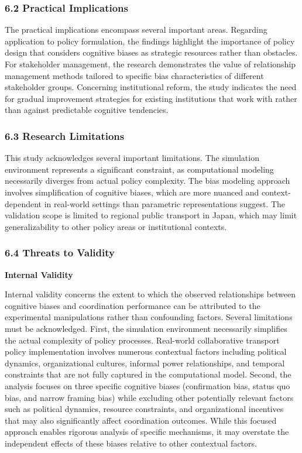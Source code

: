 \subsubsection{6.2 Practical Implications}\label{practical-implications}

The practical implications encompass several important areas. Regarding
application to policy formulation, the findings highlight the importance
of policy design that considers cognitive biases as strategic resources
rather than obstacles. For stakeholder management, the research
demonstrates the value of relationship management methods tailored to
specific bias characteristics of different stakeholder groups.
Concerning institutional reform, the study indicates the need for
gradual improvement strategies for existing institutions that work with
rather than against predictable cognitive tendencies.

\subsubsection{6.3 Research Limitations}\label{research-limitations}

This study acknowledges several important limitations. The simulation
environment represents a significant constraint, as computational
modeling necessarily diverges from actual policy complexity. The bias
modeling approach involves simplification of cognitive biases, which are
more nuanced and context-dependent in real-world settings than
parametric representations suggest. The validation scope is limited to
regional public transport in Japan, which may limit generalizability to
other policy areas or institutional contexts.

\subsubsection{6.4 Threats to Validity}\label{threats-to-validity}

\textbf{Internal Validity}

Internal validity concerns the extent to which the observed
relationships between cognitive biases and coordination performance can
be attributed to the experimental manipulations rather than confounding
factors. Several limitations must be acknowledged. First, the simulation
environment necessarily simplifies the actual complexity of policy
processes. Real-world collaborative transport policy implementation
involves numerous contextual factors including political dynamics,
organizational cultures, informal power relationships, and temporal
constraints that are not fully captured in the computational model.
Second, the analysis focuses on three specific cognitive biases
(confirmation bias, status quo bias, and narrow framing bias) while
excluding other potentially relevant factors such as political dynamics,
resource constraints, and organizational incentives that may also
significantly affect coordination outcomes. While this focused approach
enables rigorous analysis of specific mechanisms, it may overstate the
independent effects of these biases relative to other contextual
factors.

